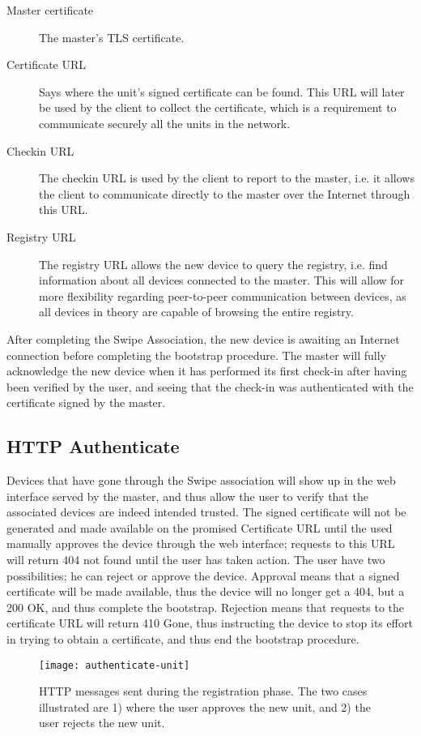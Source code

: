 \begin{description}
\item[Master certificate]
    The master's TLS certificate.
\item[Certificate URL]
    Says where the unit's signed certificate can be found. This URL will later be used by the client to collect the certificate, which is a requirement to communicate securely all the units in the network.
\item[Checkin URL]
    The checkin URL is used by the client to report to the master, i.e. it allows the client to communicate directly to the master over the Internet through this URL.
\item[Registry URL]
    The registry URL allows the new device to query the registry, i.e. find information about all devices connected to the master. This will allow for more flexibility regarding peer-to-peer communication between devices, as all devices in theory are capable of browsing the entire registry.
\end{description}

After completing the Swipe Association, the new device is awaiting an Internet connection before completing the bootstrap procedure. The master will fully acknowledge the new device when it has performed its first check-in after having been verified by the user, and seeing that the check-in was authenticated with the certificate signed by the master.

\subsection{HTTP Authenticate}
Devices that have gone through the Swipe association will show up in the web interface served by the master, and thus allow the user to verify that the associated devices are indeed intended trusted. The signed certificate will not be generated and made available on the promised Certificate URL until the used manually approves the device through the web interface; requests to this URL will return 404 not found until the user has taken action.
The user have two possibilities; he can reject or approve the device. Approval means that a signed certificate will be made available, thus the device will no longer get a 404, but a 200 OK, and thus complete the bootstrap. Rejection means that requests to the certificate URL will return 410 Gone, thus instructing the device to stop its effort in trying to obtain a certificate, and thus end the bootstrap procedure.

\begin{figure}[ht!]
    \centering
    \texttt{[image: authenticate-unit]}\label{fig:authenticate-unit}
    \caption{HTTP messages sent during the registration phase. The two cases illustrated are 1) where the user approves the new unit, and 2) the user rejects the new unit.}
\end{figure}

